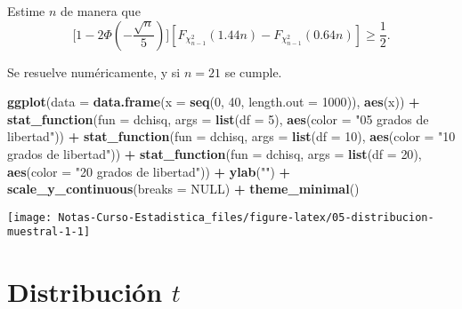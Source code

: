 \documentclass[
  12pt,
]{book}
\newenvironment{Shaded}{\begin{snugshade}}{\end{snugshade}}
\newcommand{\DataTypeTok}[1]{\textcolor[rgb]{0.13,0.29,0.53}{#1}}
\newcommand{\DecValTok}[1]{\textcolor[rgb]{0.00,0.00,0.81}{#1}}
\newcommand{\KeywordTok}[1]{\textcolor[rgb]{0.13,0.29,0.53}{\textbf{#1}}}
\newcommand{\NormalTok}[1]{#1}
\newcommand{\OperatorTok}[1]{\textcolor[rgb]{0.81,0.36,0.00}{\textbf{#1}}}
\newcommand{\OtherTok}[1]{\textcolor[rgb]{0.56,0.35,0.01}{#1}}
\newcommand{\StringTok}[1]{\textcolor[rgb]{0.31,0.60,0.02}{#1}}
\begin{document}
Estime \(n\) de manera que
\[\bigg[1-2\Phi\left(-\dfrac{\sqrt n}{5}\right)\bigg][F_{\chi^2_{n-1}}(1.44n)-F_{\chi^2_{n-1}}(0.64n)] \geq \dfrac 12.\]

Se resuelve numéricamente, y si \(n=21\) se cumple.

\begin{Shaded}
\begin{Highlighting}[]
\KeywordTok{ggplot}\NormalTok{(}\DataTypeTok{data =} \KeywordTok{data.frame}\NormalTok{(}\DataTypeTok{x =} \KeywordTok{seq}\NormalTok{(}\DecValTok{0}\NormalTok{, }\DecValTok{40}\NormalTok{, }\DataTypeTok{length.out =} \DecValTok{1000}\NormalTok{)), }\KeywordTok{aes}\NormalTok{(x)) }\OperatorTok{+}
\StringTok{  }\KeywordTok{stat\_function}\NormalTok{(}\DataTypeTok{fun =}\NormalTok{ dchisq, }\DataTypeTok{args =} \KeywordTok{list}\NormalTok{(}\DataTypeTok{df =} \DecValTok{5}\NormalTok{), }\KeywordTok{aes}\NormalTok{(}\DataTypeTok{color =} \StringTok{"05 grados de libertad"}\NormalTok{)) }\OperatorTok{+}
\StringTok{  }\KeywordTok{stat\_function}\NormalTok{(}\DataTypeTok{fun =}\NormalTok{ dchisq, }\DataTypeTok{args =} \KeywordTok{list}\NormalTok{(}\DataTypeTok{df =} \DecValTok{10}\NormalTok{), }\KeywordTok{aes}\NormalTok{(}\DataTypeTok{color =} \StringTok{"10 grados de libertad"}\NormalTok{)) }\OperatorTok{+}
\StringTok{  }\KeywordTok{stat\_function}\NormalTok{(}\DataTypeTok{fun =}\NormalTok{ dchisq, }\DataTypeTok{args =} \KeywordTok{list}\NormalTok{(}\DataTypeTok{df =} \DecValTok{20}\NormalTok{), }\KeywordTok{aes}\NormalTok{(}\DataTypeTok{color =} \StringTok{"20 grados de libertad"}\NormalTok{)) }\OperatorTok{+}
\StringTok{  }\KeywordTok{ylab}\NormalTok{(}\StringTok{""}\NormalTok{) }\OperatorTok{+}
\StringTok{  }\KeywordTok{scale\_y\_continuous}\NormalTok{(}\DataTypeTok{breaks =} \OtherTok{NULL}\NormalTok{) }\OperatorTok{+}
\StringTok{  }\KeywordTok{theme\_minimal}\NormalTok{()}
\end{Highlighting}
\end{Shaded}

\begin{center}\texttt{[image: Notas-Curso-Estadistica\_files/figure-latex/05-distribucion-muestral-1-1]} \end{center}

\hypertarget{distribuciuxf3n-t}{%
\section{\texorpdfstring{Distribución \(t\)}{Distribución t}}\label{distribuciuxf3n-t}}
\end{document}
